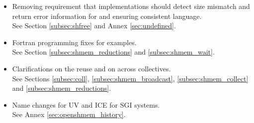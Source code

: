 \begin{itemize}
\item Removing requirement that implementations should detect size mismatch and return error information for  and ensuring consistent language.\\See Section \ref{subsec:shfree} and Annex \ref{sec:undefined}. 
\item Fortran programming fixes for examples.\\ See Section \ref{subsec:shmem_reductions} and \ref{subsec:shmem_wait}. 
\item Clarifications on the reuse  and  on across collectives.\\See Sections \ref{subsec:coll}, \ref{subsec:shmem_broadcast}, \ref{subsec:shmem_collect} and \ref{subsec:shmem_reductions}.
\item Name changes for UV and ICE for SGI systems.\\See Annex \ref{sec:openshmem_history}. \cbend
\end{itemize}
